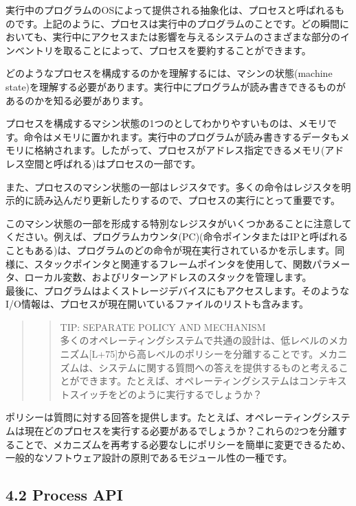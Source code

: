 実行中のプログラムのOSによって提供される抽象化は、プロセスと呼ばれるものです。上記のように、プロセスは実行中のプログラムのことです。どの瞬間においても、実行中にアクセスまたは影響を与えるシステムのさまざまな部分のインベントリを取ることによって、プロセスを要約することができます。

どのようなプロセスを構成するのかを理解するには、マシンの状態(machine
state)を理解する必要があります。実行中にプログラムが読み書きできるものがあるのかを知る必要があります。

プロセスを構成するマシン状態の1つのとしてわかりやすいものは、メモリです。命令はメモリに置かれます。実行中のプログラムが読み書きするデータもメモリに格納されます。したがって、プロセスがアドレス指定できるメモリ(アドレス空間と呼ばれる)はプロセスの一部です。

また、プロセスのマシン状態の一部はレジスタです。多くの命令はレジスタを明示的に読み込んだり更新したりするので、プロセスの実行にとって重要です。

このマシン状態の一部を形成する特別なレジスタがいくつかあることに注意してください。例えば、プログラムカウンタ(PC)(命令ポインタまたはIPと呼ばれることもある)は、プログラムのどの命令が現在実行されているかを示します。同様に、スタックポインタと関連するフレームポインタを使用して、関数パラメータ、ローカル変数、およびリターンアドレスのスタックを管理します。\\
最後に、プログラムはよくストレージデバイスにもアクセスします。そのようなI/O情報は、プロセスが現在開いているファイルのリストも含みます。

\begin{quote}
\begin{quote}
TIP: SEPARATE POLICY AND MECHANISM\\
多くのオペレーティングシステムで共通の設計は、低レベルのメカニズム{[}L+75{]}から高レベルのポリシーを分離することです。メカニズムは、システムに関する質問への答えを提供するものと考えることができます。たとえば、オペレーティングシステムはコンテキストスイッチをどのように実行するでしょうか？
\end{quote}
\end{quote}

ポリシーは質問に対する回答を提供します。たとえば、オペレーティングシステムは現在どのプロセスを実行する必要があるでしょうか？これらの2つを分離することで、メカニズムを再考する必要なしにポリシーを簡単に変更できるため、一般的なソフトウェア設計の原則であるモジュール性の一種です。

\hypertarget{process-api}{%
\subsection*{4.2 Process API}\label{process-api}}

